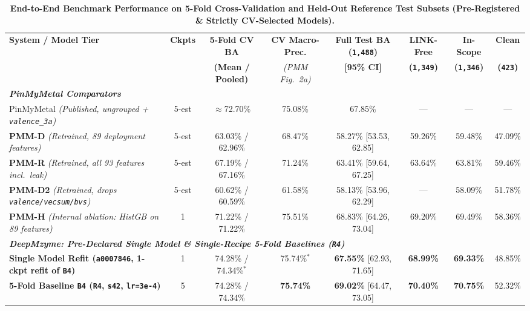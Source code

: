 \documentclass[10pt,a4paper,twocolumn]{article}
\begin{document}
\begin{table}[t!]
  \centering
  \caption{\textbf{End-to-End Benchmark Performance on 5-Fold Cross-Validation and Held-Out Reference Test Subsets (Pre-Registered \& Strictly CV-Selected Models).}}
  \label{tab:main_benchmark}
  \footnotesize
  \begin{tabular}{lccccccc}
    \toprule
    \textbf{System / Model Tier} & \textbf{Ckpts} & \textbf{5-Fold CV BA} & \textbf{CV Macro-Prec.} & \textbf{Full Test BA (\texttt{1,488})} & \textbf{LINK-Free} & \textbf{In-Scope} & \textbf{Clean} \\
     & & \textbf{(Mean / Pooled)} & \textit{(PMM Fig.\ 2a)} & \textbf{[95\% CI]} & \textbf{(\texttt{1,349})} & \textbf{(\texttt{1,346})} & \textbf{(\texttt{423})} \\
    \midrule
    \multicolumn{8}{l}{\textit{\textbf{PinMyMetal Comparators}}} \\
    PinMyMetal \textit{(Published, ungrouped + \texttt{valence\_3a})} & 5-est & $\approx$72.70\% & 75.08\% & 67.85\% & --- & --- & --- \\
    \textbf{PMM-D} \textit{(Retrained, 89 deployment features)} & 5-est & 63.03\% / 62.96\% & 68.47\% & 58.27\% [53.53, 62.85] & 59.26\% & 59.48\% & 47.09\% \\
    \textbf{PMM-R} \textit{(Retrained, all 93 features incl.\ leak)} & 5-est & 67.19\% / 67.16\% & 71.24\% & 63.41\% [59.64, 67.25] & 63.64\% & 63.81\% & 59.46\% \\
    \textbf{PMM-D2} \textit{(Retrained, drops \texttt{valence/vecsum/bvs})} & 5-est & 60.62\% / 60.59\% & 61.58\% & 58.13\% [53.96, 62.29] & --- & 58.09\% & 51.78\% \\
    \textbf{PMM-H} \textit{(Internal ablation: HistGB on 89 features)} & 1 & 71.22\% / 71.22\% & 75.51\% & 68.83\% [64.26, 73.04] & 69.20\% & 69.49\% & 58.36\% \\
    \midrule
    \multicolumn{8}{l}{\textit{\textbf{DeepMzyme: Pre-Declared Single Model \& Single-Recipe 5-Fold Baselines (\texttt{R4})}}} \\
    \textbf{Single Model Refit (\texttt{a0007846}, 1-ckpt refit of \texttt{B4})} & 1 & 74.28\% / 74.34\%$^*$ & 75.74\%$^*$ & \textbf{67.55\%} [62.93, 71.65] & \textbf{68.99\%} & \textbf{69.33\%} & 48.85\% \\
    \textbf{5-Fold Baseline \texttt{B4} (\texttt{R4}, \texttt{s42}, \texttt{lr=3e-4})} & 5 & 74.28\% / 74.34\% & \textbf{75.74\%} & \textbf{69.02\%} [64.47, 73.05] & \textbf{70.40\%} & \textbf{70.75\%} & 52.32\% \\

\end{tabular}
\end{table}
\end{document}
